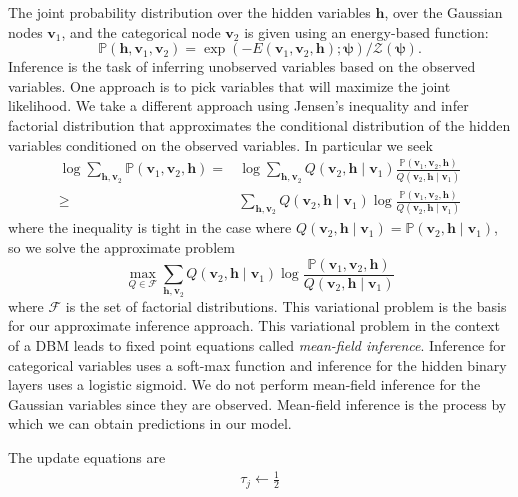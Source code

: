 \documentclass{article} %
\begin{document}
The joint probability distribution over the hidden variables $\mathbf{h}$, over the Gaussian nodes $\mathbf{v}_1$,
and the categorical node $\mathbf{v}_2$ is given using an energy-based function:
\begin{equation}
\mathbb{P}(\mathbf{h},\mathbf{v}_1,\mathbf{v}_2) = \exp(-E(\mathbf{v}_1,\mathbf{v}_2,\mathbf{h});\boldsymbol{\psi})/\mathcal{Z}(\boldsymbol{\psi}).
\end{equation}
Inference is the task of inferring unobserved variables based on the observed variables. One approach is to pick variables that will
maximize the joint likelihood.  We take a different approach using Jensen's inequality and infer factorial distribution that approximates
the conditional distribution of the hidden variables conditioned on the observed variables.
In particular we seek
\begin{align}
\log \sum_{\mathbf{h},\mathbf{v}_2} \mathbb{P}(\mathbf{v}_1,\mathbf{v}_2,\mathbf{h}) =& \log \sum_{\mathbf{h},\mathbf{v}_2} Q(\mathbf{v}_2,\mathbf{h}\mid\mathbf{v}_1) \frac{\mathbb{P}(\mathbf{v}_1,\mathbf{v}_2,\mathbf{h})}{Q(\mathbf{v}_2,\mathbf{h}\mid\mathbf{v}_1)}\\
\geq& \sum_{\mathbf{h},\mathbf{v}_2} Q(\mathbf{v}_2,\mathbf{h}\mid\mathbf{v}_1) \log \frac{\mathbb{P}(\mathbf{v}_1,\mathbf{v}_2,\mathbf{h})}{Q(\mathbf{v}_2,\mathbf{h}\mid\mathbf{v}_1)}
\end{align}
where the inequality is tight in the case where $Q(\mathbf{v}_2,\mathbf{h}\mid\mathbf{v}_1)=\mathbb{P}(\mathbf{v}_2,\mathbf{h}\mid\mathbf{v}_1)$, so we solve the approximate problem
\begin{equation}
\max_{Q\in\mathcal{F}}\sum_{\mathbf{h},\mathbf{v}_2} Q(\mathbf{v}_2,\mathbf{h}\mid\mathbf{v}_1) \log \frac{\mathbb{P}(\mathbf{v}_1,\mathbf{v}_2,\mathbf{h})}{Q(\mathbf{v}_2,\mathbf{h}\mid\mathbf{v}_1)}
\end{equation}
where $\mathcal{F}$ is the set of factorial distributions. This variational problem is the basis for our approximate inference approach.
This variational problem in the context of a DBM leads to fixed point equations called {\it mean-field inference}.  Inference for
categorical variables uses a soft-max function and inference for the hidden binary layers uses a logistic sigmoid.  We do not perform
mean-field inference for the Gaussian variables since they are observed.  Mean-field inference is the process by which we can obtain
predictions in our model.

The update equations are
\begin{align}
\tau_j \leftarrow \frac{1}{2}
\end{align}
\end{document}
